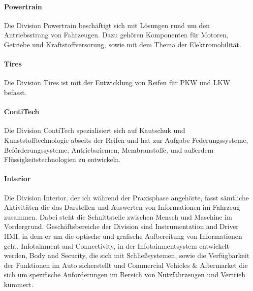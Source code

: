 \paragraph{Powertrain}
Die Division Powertrain beschäftigt sich mit Lösungen rund um den Antriebsstrang von Fahrzeugen. Dazu gehören Komponenten für Motoren, Getriebe und Kraftstoffversorung, sowie mit dem Thema der Elektromobilität. 

\paragraph{Tires}
Die Division Tires ist mit der Entwicklung von Reifen für PKW und LKW befasst. 
\paragraph{ContiTech}
Die Division ContiTech spezialisiert sich auf Kautschuk und Kunststofftechnologie abseits der Reifen und hat zur Aufgabe Federungssysteme, Beförderungssysteme, Antriebsriemen, Membranstoffe, und außerdem Flüssigkeitstechnologien zu entwickeln. 

\paragraph{Interior}
Die Division Interior, der ich während der Praxisphase angehörte, fasst sämtliche Aktivitäten die das Darstellen und Auswerten von Informationen im Fahrzeug zusammen. Dabei steht die Schnittstelle zwischen Mensch und Maschine im Vordergrund.
Geschäftsbereiche der Division sind Instrumentation and Driver HMI, in dem er um die optische und grafische Aufbereitung von Informationen geht, Infotainment and Connectivity, in der Infotainmentsystem entwickelt werden, Body and Security, die sich  mit Schließsystemen, sowie die Verfügbarkeit der Funktionen im Auto sicherstellt  und Commercial Vehicles \& Aftermarket die sich um spezifische Anforderungen im Bereich von Nutzfahrzeugen und Vertrieb kümmert.



